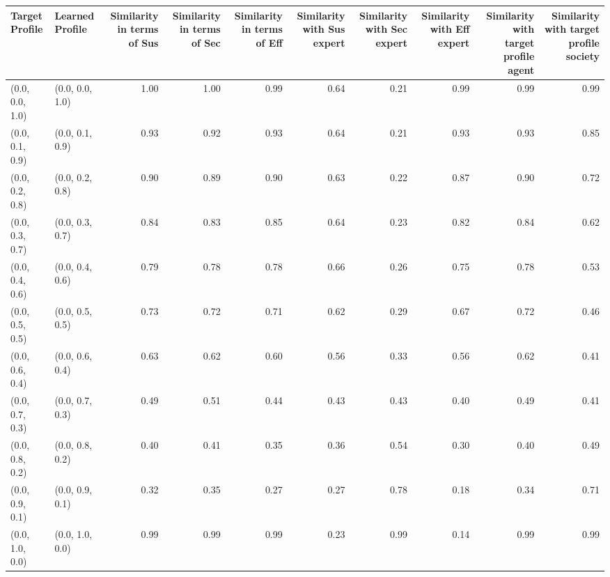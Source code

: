 \begin{tabular}{llrrrrrrrr}
\toprule
Target Profile & Learned Profile & Similarity in terms of Sus & Similarity in terms of Sec & Similarity in terms of Eff & Similarity with Sus expert & Similarity with Sec expert & Similarity with Eff expert & Similarity with target profile agent & Similarity with target profile society \\
\midrule
(0.0, 0.0, 1.0) & (0.0, 0.0, 1.0) & 1.00 & 1.00 & 0.99 & 0.64 & 0.21 & 0.99 & 0.99 & 0.99 \\
(0.0, 0.1, 0.9) & (0.0, 0.1, 0.9) & 0.93 & 0.92 & 0.93 & 0.64 & 0.21 & 0.93 & 0.93 & 0.85 \\
(0.0, 0.2, 0.8) & (0.0, 0.2, 0.8) & 0.90 & 0.89 & 0.90 & 0.63 & 0.22 & 0.87 & 0.90 & 0.72 \\
(0.0, 0.3, 0.7) & (0.0, 0.3, 0.7) & 0.84 & 0.83 & 0.85 & 0.64 & 0.23 & 0.82 & 0.84 & 0.62 \\
(0.0, 0.4, 0.6) & (0.0, 0.4, 0.6) & 0.79 & 0.78 & 0.78 & 0.66 & 0.26 & 0.75 & 0.78 & 0.53 \\
(0.0, 0.5, 0.5) & (0.0, 0.5, 0.5) & 0.73 & 0.72 & 0.71 & 0.62 & 0.29 & 0.67 & 0.72 & 0.46 \\
(0.0, 0.6, 0.4) & (0.0, 0.6, 0.4) & 0.63 & 0.62 & 0.60 & 0.56 & 0.33 & 0.56 & 0.62 & 0.41 \\
(0.0, 0.7, 0.3) & (0.0, 0.7, 0.3) & 0.49 & 0.51 & 0.44 & 0.43 & 0.43 & 0.40 & 0.49 & 0.41 \\
(0.0, 0.8, 0.2) & (0.0, 0.8, 0.2) & 0.40 & 0.41 & 0.35 & 0.36 & 0.54 & 0.30 & 0.40 & 0.49 \\
(0.0, 0.9, 0.1) & (0.0, 0.9, 0.1) & 0.32 & 0.35 & 0.27 & 0.27 & 0.78 & 0.18 & 0.34 & 0.71 \\
(0.0, 1.0, 0.0) & (0.0, 1.0, 0.0) & 0.99 & 0.99 & 0.99 & 0.23 & 0.99 & 0.14 & 0.99 & 0.99 \\
\bottomrule
\end{tabular}
